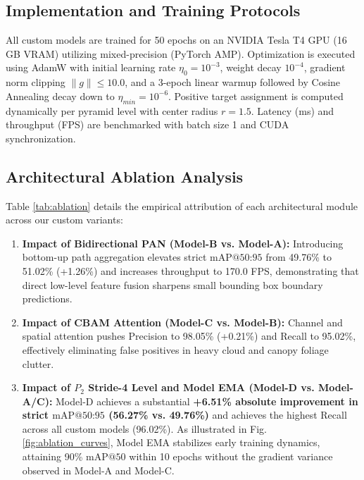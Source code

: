 \documentclass[conference]{IEEEtran}
\begin{document}
\subsection{Implementation and Training Protocols}
All custom models are trained for 50 epochs on an NVIDIA Tesla T4 GPU (16 GB VRAM) utilizing mixed-precision (PyTorch AMP). Optimization is executed using AdamW \cite{loshchilov2018decoupled} with initial learning rate $\eta_0 = 10^{-3}$, weight decay $10^{-4}$, gradient norm clipping $\|g\| \le 10.0$, and a 3-epoch linear warmup followed by Cosine Annealing decay down to $\eta_{min} = 10^{-6}$. Positive target assignment is computed dynamically per pyramid level with center radius $r = 1.5$. Latency (ms) and throughput (FPS) are benchmarked with batch size 1 and CUDA synchronization.

\subsection{Architectural Ablation Analysis}
Table \ref{tab:ablation} details the empirical attribution of each architectural module across our custom variants:
\begin{enumerate}
    \item \textbf{Impact of Bidirectional PAN (Model-B vs. Model-A):} Introducing bottom-up path aggregation elevates strict $\text{mAP@50:95}$ from 49.76\% to 51.02\% (+1.26\%) and increases throughput to 170.0 FPS, demonstrating that direct low-level feature fusion sharpens small bounding box boundary predictions.
    \item \textbf{Impact of CBAM Attention (Model-C vs. Model-B):} Channel and spatial attention pushes Precision to 98.05\% (+0.21\%) and Recall to 95.02\%, effectively eliminating false positives in heavy cloud and canopy foliage clutter.
    \item \textbf{Impact of $P_2$ Stride-4 Level and Model EMA (Model-D vs. Model-A/C):} Model-D achieves a substantial \textbf{+6.51\% absolute improvement in strict $\text{mAP@50:95}$ (56.27\% vs. 49.76\%)} and achieves the highest Recall across all custom models (96.02\%). As illustrated in Fig. \ref{fig:ablation_curves}, Model EMA stabilizes early training dynamics, attaining 90\% $\text{mAP@50}$ within 10 epochs without the gradient variance observed in Model-A and Model-C.
\end{enumerate}
\end{document}
